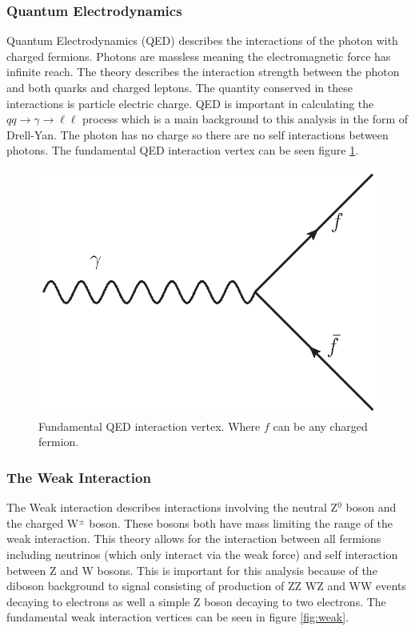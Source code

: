     \subsubsection*{Quantum Electrodynamics}
    Quantum Electrodynamics (QED) describes the interactions of the photon with charged fermions. Photons are massless meaning the electromagnetic force has infinite reach. The theory describes the interaction strength between the photon and both quarks and charged leptons. The quantity conserved in these interactions is particle electric charge. QED is important in calculating the $qq \rightarrow\gamma\rightarrow\ell\ell$ process which is a main background to this analysis in the form of Drell-Yan. The photon has no charge so there are no self interactions between photons. The fundamental QED interaction vertex can be seen figure \ref{fig:QED}.

    \begin{figure}[h]
        \begin{center}
        \includegraphics[width=0.5\linewidth]{images/gamma_fermion.eps}
        \end{center}
        \caption{Fundamental QED interaction vertex. Where $f$ can be any charged fermion.}
        \label{fig:QED}
    \end{figure}

    \subsubsection*{The Weak Interaction}
    The Weak interaction describes interactions involving the neutral Z$^{0}$ boson and the charged W$^{\pm}$ boson. These bosons both have mass limiting the range of the weak interaction. 
    This theory allows for the interaction between all fermions including neutrinos (which only interact via the weak force) and self interaction between Z and W bosons. This is important for this analysis because of the diboson background to signal consisting of production of ZZ WZ and WW events decaying to electrons as well a simple Z boson decaying to two electrons. The fundamental weak interaction vertices can be seen in figure \ref{fig:weak}.

